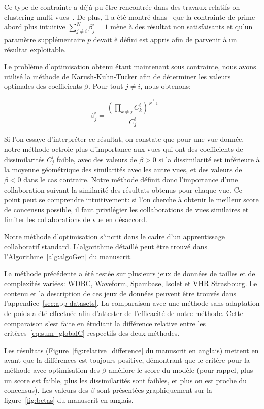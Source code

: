 Ce type de contrainte a déjà pu \^{e}tre rencontrée dans des travaux relatifs on clustering multi-vues~\cite{CarvalhoML15}. De plus, il a été montré dans~\cite{Sublime2017} que la contrainte de prime abord plus intuitive $\sum_{j \neq i}^N \beta_j^i = 1$ mène à des résultat non satisfaisants et qu'un paramètre supplémentaire $p$ devait \^{e} défini est appris  afin de parvenir à un résultat exploitable.

Le problème d'optimisation obtenu étant maintenant sous contrainte, nous avons utilisé la méthode de Karush-Kuhn-Tucker afin de déterminer les valeurs optimales des coefficients $\beta$. Pour tout $j \neq i$, nous obtenons:

\begin{equation}
\beta_j^i =  \frac{{(\prod_{k\neq j} C_k^i)}^{\frac 1 {N-1}}} {C_j^i} \qquad
\label{eq:sum_kkt_alpha}
\end{equation} 

Si l'on essaye d'interpréter ce résultat, on constate que pour une vue donnée, notre méthode octroie plus d'importance aux vues qui ont des coefficients de dissimilarités $C_j^i$ faible, avec des valeurs de $\beta>0$ si la dissimilarité est inférieure à la moyenne géométrique des similarités avec les autre vues, et des valeurs de $\beta<0$ dans le cas contraire. Notre méthode définit donc l'importance d'une collaboration suivant la similarité des résultats obtenus pour chaque vue. Ce point peut se comprendre intuitivement: si l'on cherche à obtenir le meilleur score de concensus possible, il faut privilégier les collaborations de vues similaires et limiter les collaborations de vue en désaccord.

Notre méthode d'optimisation s'incrit dans le cadre d'un apprentissage collaboratif standard. L'algorithme détaillé peut \^{e}tre trouvé dans l'Algorithme~\ref{alg:algoGen} du manuscrit.

La méthode précédente a été testée sur plusieurs jeux de données de tailles et de complexités variées: WDBC, Waveform, Spambase, Isolet et VHR Strasbourg. Le contenu et la description de ces jeux de données peuvent \^{e}tre trouvés dans l'appendice~\ref{sec:app-datasets}. La comparaison avec une méthode sans adaptation de poids a été effectuée afin d'attester de l'efficacité de notre méthode. Cette comparaison s'est faite en étudiant la différence relative entre les critères~\ref{eq:sum_globalC} respectifs des deux méthodes. 

Les résultats (Figure~\ref{fig:relative_difference} du manuscrit en anglais) mettent en avant que la différences est toujours positive, démontrant que le critère pour la méthode avec optimisation des $\beta$ améliore le score du modèle (pour rappel, plus un score est faible, plus les dissimilarités sont faibles, et plus on est proche du concensus). Les valeurs des $\beta$ sont présentées graphiquement sur la figure~\ref{fig:betas} du manuscrit en anglais.

